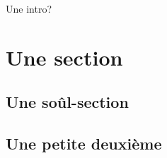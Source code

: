 \documentclass{../fiche}
\begin{document}

Une intro?

\section*{Une section}

\subsection*{Une soûl-section}

\subsection*{Une petite deuxième}
\end{document}
